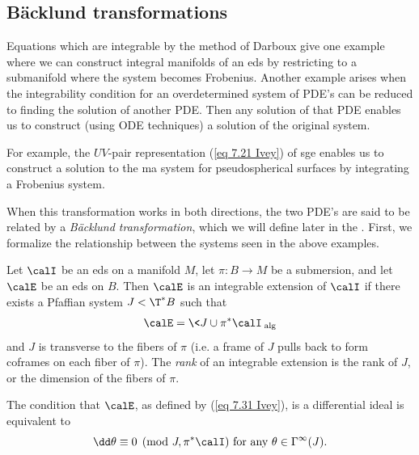 \subsection{B\"acklund transformations}


Equations which are integrable by the method of Darboux give one example where we can construct integral manifolds of an \gls{eds} by restricting to a submanifold where the system becomes Frobenius. Another example arises when the integrability condition for an overdetermined system of PDE's can be reduced to finding the solution of another PDE. Then any solution of that PDE enables us to construct (using ODE techniques) a solution of the original system.

\begin{example}\label{ex 7.5.1 Ivey}
    For example, the $UV$-pair representation (\ref{eq 7.21 Ivey}) of \gls{sge} enables us to construct a solution to the \gls{ma} system for pseudospherical surfaces by integrating a Frobenius system.
\end{example}

When this transformation works in both directions, the two PDE's are said to be related by a \emph{B\"acklund transformation}, which we will define later in the \subsect. First, we formalize the relationship between the systems seen in the above examples.

\begin{defn}
    Let $\calI$ be an \gls{eds} on a manifold $M$, let $\pi:B\to M$ be a submersion, and let $\calE$ be an \gls{eds} on $B$. Then $\calE$ is an integrable extension of $\calI$ if there exists a Pfaffian system $J<\T^\ast B$ such that 
    \[\calE=\<J\cup \pi^\ast\calI\>_{\mathrm{alg}}\label{eq 7.31 Ivey}\]
    and $J$ is transverse to the fibers of $\pi$ (i.e. a frame of $J$ pulls back to form coframes on each fiber of $\pi$).  The \emph{rank} of an integrable extension is the rank of $J$, or the dimension of the fibers of $\pi$.
\end{defn}


The condition that $\calE$, as defined by (\ref{eq 7.31 Ivey}), is a differential ideal is equivalent to 
\[\dd\theta\equiv 0\pmod{J,\pi^\ast\calI}\text{ for any }\theta\in\Gamma^\infty(J).\label{eq 7.32 Ivey}\]


